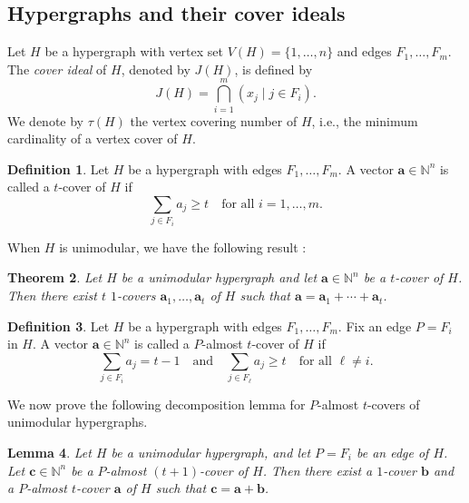 \documentclass[12pt,amscd]{amsart}
\newtheorem{thm}{Theorem}[section]
\newtheorem{lem}[thm]{Lemma}
\theoremstyle{definition}
\newtheorem{defn}[thm]{Definition}
\numberwithin{equation}{section}
\begin{document}
\subsection{Hypergraphs and their cover ideals}

Let $H$ be a hypergraph with vertex set $V(H) = \{1, \ldots, n\}$ and edges $F_1, \ldots, F_m$. The \emph{cover ideal} of $H$, denoted by $J(H)$, is defined by
\[
J(H) = \bigcap_{i=1}^m (x_j \mid j \in F_i).
\]
We denote by $\tau(H)$ the vertex covering number of $H$, i.e., the minimum cardinality of a vertex cover of $H$.

\begin{defn}
Let $H$ be a hypergraph with edges $F_1, \ldots, F_m$. A vector $\mathbf{a} \in \mathbb{N}^n$ is called a $t$-cover of $H$ if 
\[
\sum_{j \in F_i} a_j \ge t \quad \text{for all } i = 1, \ldots, m.
\]
\end{defn}

When $H$ is unimodular, we have the following result \cite[Theorem 1.1]{HHT}:

\begin{thm}\label{thm_decomp}
Let $H$ be a unimodular hypergraph and let $\mathbf{a} \in \mathbb{N}^n$ be a $t$-cover of $H$. Then there exist $t$ $1$-covers $\mathbf{a}_1, \ldots, \mathbf{a}_t$ of $H$ such that $\mathbf{a} = \mathbf{a}_1 + \cdots + \mathbf{a}_t$. 
\end{thm}

\begin{defn}
Let $H$ be a hypergraph with edges $F_1, \ldots, F_m$. Fix an edge $P = F_i$ in $H$. A vector $\mathbf{a} \in \mathbb{N}^n$ is called a $P$-almost $t$-cover of $H$ if 
\[
\sum_{j \in F_i} a_j = t-1 \quad \text{and} \quad \sum_{j \in F_\ell} a_j \ge t \quad \text{for all } \ell \neq i.
\]
\end{defn}

We now prove the following decomposition lemma for $P$-almost $t$-covers of unimodular hypergraphs.

\begin{lem}\label{lem_decomp1}
Let $H$ be a unimodular hypergraph, and let $P = F_i$ be an edge of $H$. Let $\mathbf{c} \in \mathbb{N}^n$ be a $P$-almost $(t+1)$-cover of $H$. Then there exist a $1$-cover $\mathbf{b}$ and a $P$-almost $t$-cover $\mathbf{a}$ of $H$ such that $\mathbf{c} = \mathbf{a} + \mathbf{b}$.
\end{lem}
\end{document}
